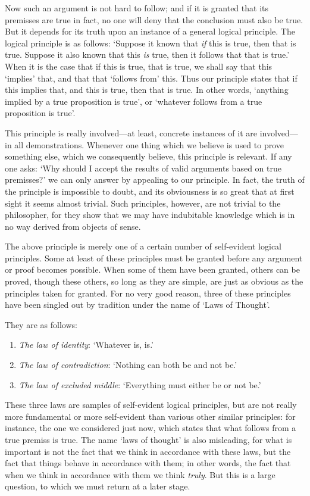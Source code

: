 \documentclass[oneside,letterpaper,12pt]{book}
\begin{document}
Now such an argument is not hard to follow; and if it is granted that
its premisses are true in fact, no one will deny that the conclusion
must also be true. But it depends for its truth upon an instance of a
general logical principle. The logical principle is as follows:
`Suppose it known that \emph{if} this is true, then that
is true. Suppose it also known that this \emph{is} true, then it follows
that that is true.' When it is the case that if this is
true, that is true, we shall say that this
`implies' that, and that that
`follows from' this. Thus our principle
states that if this implies that, and this is true, then that is true.
\label{mp} In other words, `anything implied by a true proposition
is true', or `whatever follows from a
true proposition is true'.

This principle is really involved---at least, concrete instances of it
are involved---in all demonstrations. Whenever one thing which we
believe is used to prove something else, which we consequently believe,
this principle is relevant. If any one asks: `Why should
I accept the results of valid arguments based on true
premisses?' we can only answer by appealing to our
principle. In fact, the truth of the principle is impossible to doubt,
and its obviousness is so great that at first sight it seems almost
trivial. Such principles, however, are not trivial to the philosopher,
for they show that we may have indubitable knowledge which is in no way
derived from objects of sense.

The above principle is merely one of a certain number of self-evident
logical principles. Some at least of these principles must be granted
before any argument or proof becomes possible. When some of them have
been granted, others can be proved, though these others, so long as they
are simple, are just as obvious as the principles taken for granted. For
no very good reason, three of these principles have been singled out by
tradition under the name of `Laws of
Thought'.

They are as follows:
\begin{enumerate}[label=(\arabic*)]
	\item {\emph{The law of identity}: `Whatever is,
is.' \label{identity}} 
	\item {\emph{The law of contradiction}: `Nothing can both
be and not be.'  \label{lnc}}
	\item {\emph{The law of excluded middle}: `Everything must
either be or not be.' \label{lem}}
\end{enumerate}
These three laws are samples of self-evident logical principles, but are
not really more fundamental or more self-evident than various other
similar principles: for instance, the one we considered just now, which
states that what follows from a true premiss is true. The name
`laws of thought' is also misleading,
for what is important is not the fact that we think in accordance with
these laws, but the fact that things behave in accordance with them; in
other words, the fact that when we think in accordance with them we
think \emph{truly}. But this is a large question, to which we must
return at a later stage.
\end{document}
